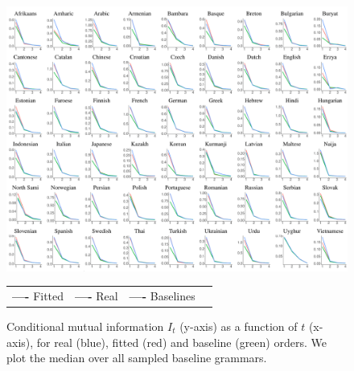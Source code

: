 \begin{figure}
	\begin{center}
\includegraphics[width=\textwidth]{it-table-mle.pdf}
\end{center}

\begin{center}
\begin{tabular}{llll}
\textbf{\textcolor{fitted}{----}} Fitted&
\textbf{\textcolor{real}{----}} Real&
\textbf{\textcolor{baseline}{----}} Baselines&
\end{tabular}
\end{center}
\caption{Conditional mutual information $I_t$ (y-axis) as a function of $t$ (x-axis), for real (blue), fitted (red) and baseline (green) orders. We plot the median over all sampled baseline grammars.}\label{fig:it}
\end{figure}




